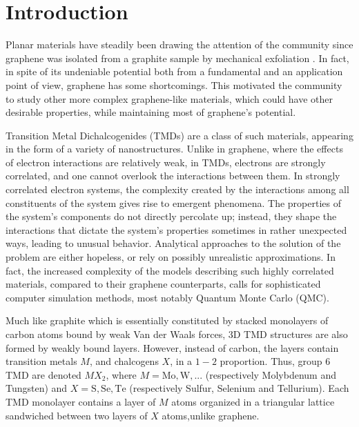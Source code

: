 
\section{Introduction}
\label{sec:intro}

Planar materials have steadily been drawing the attention of the community since graphene was isolated from a graphite sample by mechanical exfoliation \cite{novoselov_electric_2004}.
In fact, in spite of its undeniable potential both from a fundamental and an application point of view, graphene has some shortcomings.
This motivated the community to study other more complex graphene-like materials, which could have other desirable properties, while maintaining most of graphene's potential.

Transition Metal Dichalcogenides (TMDs) are a class of such materials, appearing in the form of a variety of nanostructures.
Unlike in graphene, where the effects of electron interactions are relatively weak, in TMDs, electrons are strongly correlated, and one cannot overlook the interactions between them.
In strongly correlated electron systems, the complexity created by the interactions among all constituents of the system gives rise to emergent phenomena.
The properties of the system’s components do not directly percolate up; instead, they shape the interactions that dictate the system’s properties sometimes in rather unexpected ways, leading to unusual behavior.
Analytical approaches to the solution of the problem are either hopeless, or rely on possibly unrealistic approximations.
In fact, the increased complexity of the models describing such highly correlated materials, compared to their graphene counterparts, calls for sophisticated computer simulation methods, most notably Quantum Monte Carlo (QMC).

Much like graphite which is essentially constituted by stacked monolayers of carbon atoms bound by weak Van der Waals forces, 3D TMD structures are also formed by weakly bound layers.
However, instead of carbon, the layers contain transition metals $M$, and chalcogens $X$, in a $1-2$ proportion.
Thus, group 6 TMD are denoted $MX_2$, where $M = \text{Mo}, \text{W}, ...$ (respectively Molybdenum and Tungsten) and $X = \text{S}, \text{Se}, \text{Te}$ (respectively Sulfur, Selenium and Tellurium).
Each TMD monolayer contains a layer of $M$ atoms organized in a triangular lattice sandwiched between two layers of $X$ atoms,unlike graphene.

